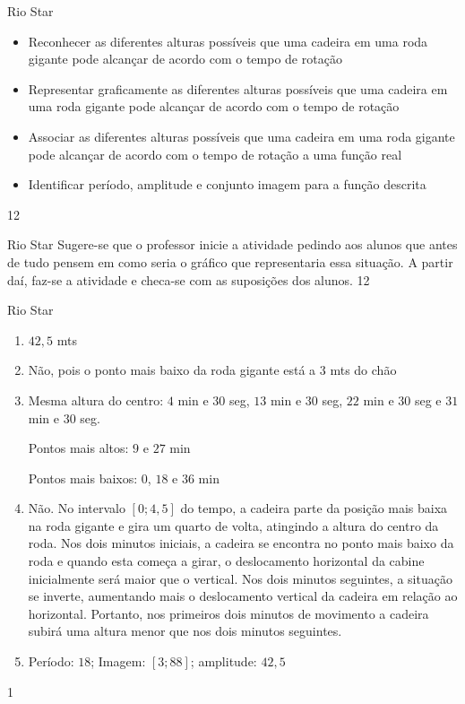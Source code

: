 \begin{objectives}{Rio Star}
{
\begin{itemize}
\item Reconhecer as diferentes alturas possíveis que uma cadeira em uma roda gigante pode alcançar de acordo com o tempo de rotação 
\item Representar graficamente as diferentes alturas possíveis que uma cadeira em uma roda gigante pode alcançar de acordo com o tempo de rotação
\item Associar as diferentes alturas possíveis que uma cadeira em uma roda gigante pode alcançar de acordo com o tempo de rotação a uma função real
\item Identificar período, amplitude e conjunto imagem para a função descrita 
\end{itemize}
}{1}{2}
\end{objectives}
\begin{sugestions}{Rio Star}
{
Sugere-se que o professor inicie a atividade pedindo aos alunos que antes de tudo pensem em como seria o gráfico que representaria essa situação. A partir daí, faz-se a atividade e checa-se com as suposições dos alunos.
}{1}{2}
\end{sugestions}
\begin{answer}{Rio Star}
{
	\begin{enumerate}
	\item $42{,}5$ mts
	\item Não, pois o ponto mais baixo da roda gigante está a $3$ mts
	do chão
	\item Mesma altura do centro: $4$ min e $30$ seg, $13$ min e $30$ seg,
	$22$ min e $30$ seg e $31$ min e $30$ seg.

	Pontos mais altos: $9$ e $27$ min

	Pontos mais baixos: $0$, $18$ e $36$ min
	\item Não. No intervalo $[0; 4{,}5]$ do tempo, a cadeira parte da
	posição mais baixa na roda gigante e gira um quarto de volta,
	atingindo a altura do centro da roda. Nos dois minutos
	iniciais, a cadeira se encontra no ponto mais baixo da roda e
	quando esta começa a girar, o deslocamento horizontal da
	cabine inicialmente será maior que o vertical. Nos dois
	minutos seguintes, a situação se inverte, aumentando mais o
	deslocamento vertical da cadeira em relação ao horizontal.
	Portanto, nos primeiros dois minutos de movimento a cadeira
	subirá uma altura menor que nos dois minutos seguintes.
	\item Período: $18$; Imagem: $[3;88]$; amplitude: $42{,}5$
	\end{enumerate}
}{1}
\end{answer}
